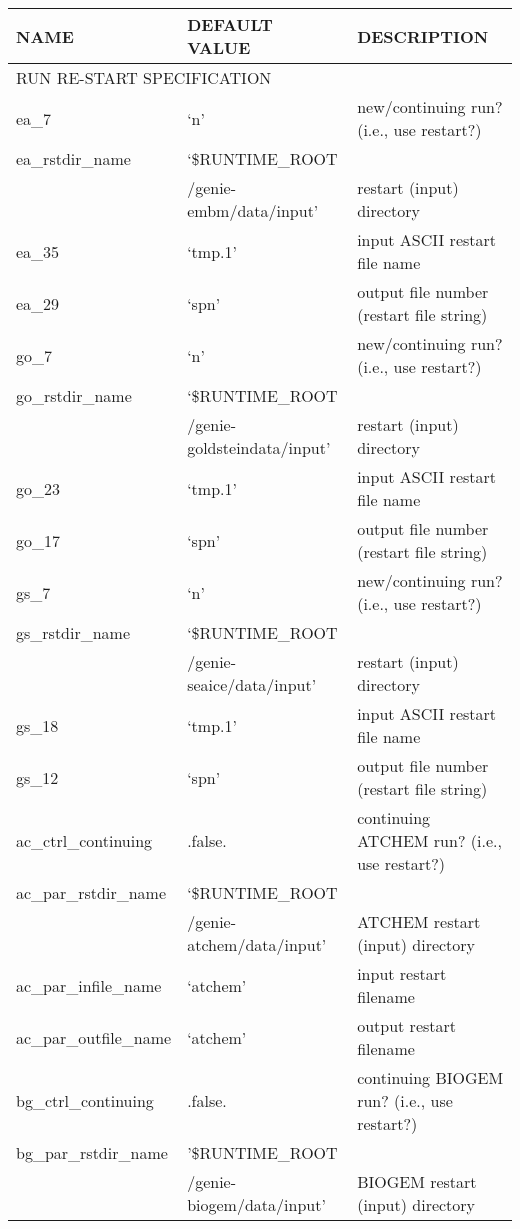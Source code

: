\documentclass[english,10pt,twoside]{article}
\begin{document}
   
\begin{tabular}{ | l | l | l |}
   \hline
   NAME & DEFAULT VALUE & DESCRIPTION \\ \hline
   \multicolumn{3}{|l|}{RUN RE-START SPECIFICATION} \\ \hline
   ea\_7 & `n' & new/continuing run? (i.e., use restart?) \\ \hline
   ea\_rstdir\_name & `\$RUNTIME\_ROOT & \\
    & /genie-embm/data/input' & restart (input) directory \\ \hline
   ea\_35 & `tmp.1' & input ASCII restart file name \\ \hline
   ea\_29 & `spn' & output file number (restart file string) \\ \hline
   go\_7 & `n' & new/continuing run? (i.e., use restart?) \\ \hline
   go\_rstdir\_name & `\$RUNTIME\_ROOT & \\
    & /genie-goldsteindata/input' & restart (input) directory \\ \hline
   go\_23 & `tmp.1' & input ASCII restart file name \\ \hline
   go\_17 & `spn' & output file number (restart file string) \\ \hline
   gs\_7 & `n' & new/continuing run? (i.e., use restart?) \\ \hline
   gs\_rstdir\_name & `\$RUNTIME\_ROOT & \\
    & /genie-seaice/data/input' & restart (input) directory \\ \hline
   gs\_18 & `tmp.1' & input ASCII restart file name \\ \hline
   gs\_12 & `spn' & output file number (restart file string) \\ \hline
   ac\_ctrl\_continuing & .false. & continuing ATCHEM run? (i.e., use restart?) \\ \hline
   ac\_par\_rstdir\_name & `\$RUNTIME\_ROOT& \\
    & /genie-atchem/data/input' & ATCHEM restart (input) directory \\ \hline
   ac\_par\_infile\_name & `atchem' & input restart filename \\ \hline
   ac\_par\_outfile\_name & `atchem' & output restart filename \\ \hline
   bg\_ctrl\_continuing & .false. & continuing BIOGEM run? (i.e., use restart?) \\ \hline
   bg\_par\_rstdir\_name & '\$RUNTIME\_ROOT & \\
    & /genie-biogem/data/input' & BIOGEM restart (input) directory \\ \hline

\end{tabular}
\end{document}
